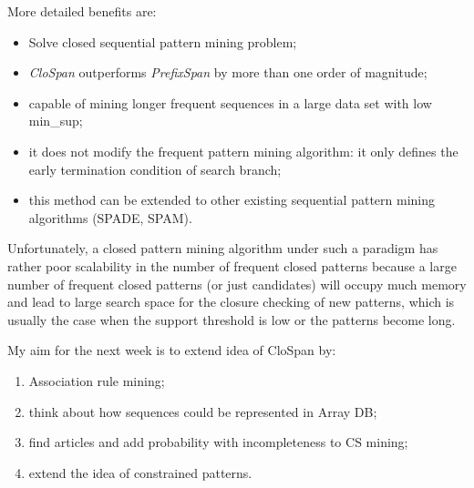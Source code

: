 \documentclass[journal]{IEEEtran}
\begin{document}
More detailed benefits are:
\begin{itemize}
\item Solve closed sequential pattern mining problem;
\item {\it CloSpan} outperforms {\it PrefixSpan} by more than one order of magnitude;
\item capable of mining longer frequent sequences in a large data set with low min\_sup;
\item it does not modify the frequent pattern mining algorithm: it only defines the early termination condition of search branch;
\item this method can be extended to other existing sequential pattern mining algorithms (SPADE, SPAM).
\end{itemize}

\par Unfortunately, a closed pattern mining algorithm under such a paradigm has rather poor scalability in the number of frequent closed patterns because a large number of frequent closed patterns (or just candidates) will occupy much memory and lead to large search space for the closure checking of new patterns, which is usually the case when the support threshold is low or the patterns become long.

My aim for the next week is to extend idea of CloSpan by:
\begin{enumerate}
	\item Association rule mining;
	\item think about how sequences could be represented in Array DB;
	\item find articles and add probability with incompleteness to CS mining;
	\item extend the idea of constrained patterns.
\end{enumerate}



\end{document}
